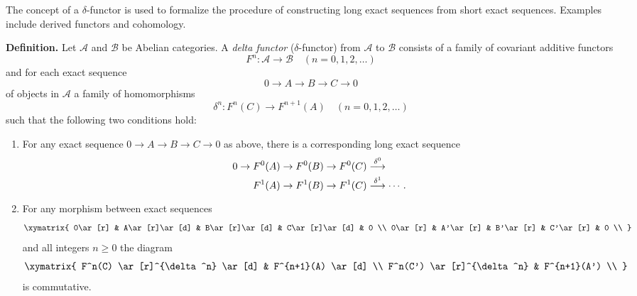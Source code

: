 \documentclass[12pt]{article}
\begin{document}
The concept of a $\delta$-functor is used to formalize the procedure
of constructing long exact sequences from short exact sequences.
Examples include derived functors and cohomology.

{\bf Definition.}\enspace
Let $\mathcal{A}$ and $\mathcal{B}$ be Abelian categories.  A
\emph{delta functor} ($\delta$-functor) from $\mathcal{A}$ to
$\mathcal{B}$ consists of a family of covariant additive
functors
$$
F^n\colon\mathcal{A}\to\mathcal{B}\quad(n=0,1,2,\ldots)
$$
and for each exact sequence
$$
0\to A\to B\to C\to 0
$$
of objects in $\mathcal{A}$ a family of homomorphisms
$$
\delta^n\colon F^n(C)\to F^{n+1}(A)\quad(n=0,1,2,\ldots)
$$
such that the following two conditions hold:
\begin{enumerate}
\item For any exact sequence $0\to A\to B\to C\to 0$ as above, there
is a corresponding long exact sequence
$$
\vcenter{\openup\jot
\ialign{\hfil$\displaystyle{#{}}$&$\displaystyle{#}$\hfil\crcr
0\to& F^0(A)\to F^0(B)\to F^0(C)\stackrel{\delta^0}{\longrightarrow}\cr
&F^1(A)\to F^1(B)\to
F^1(C)\stackrel{\delta^1}{\longrightarrow}\cdots.\cr}}
$$
\item For any morphism between exact sequences
$$
\xymatrix{
0\ar[r] & A\ar[r]\ar[d] & B\ar[r]\ar[d] & C\ar[r]\ar[d] & 0 \\
0\ar[r] & A'\ar[r] & B'\ar[r] & C'\ar[r] & 0 \\
}
$$
and all integers $n\ge 0$ the diagram
$$
\xymatrix{
F^n(C) \ar[r]^{\delta^n} \ar[d] & F^{n+1}(A) \ar[d] \\
F^n(C') \ar[r]^{\delta^n} & F^{n+1}(A') \\
}
$$
is commutative.
\end{enumerate}
\end{document}
